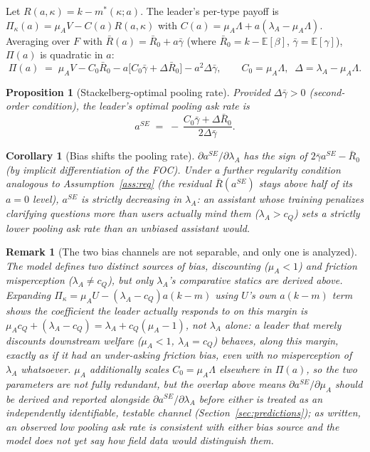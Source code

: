 \documentclass[11pt]{article}
\newtheorem{proposition}{Proposition}
\newtheorem{corollary}{Corollary}
\newtheorem{remark}{Remark}
\begin{document}
Let $R(a,\kappa)=k-m^*(\kappa;a)$. The leader's per-type payoff is
$\Pi_\kappa(a) = \mu_A V - C(a)R(a,\kappa)$ with $C(a)=\mu_A\Lambda + a(\lambda_A -
\mu_A\Lambda)$. Averaging over $F$ with $\bar R(a) = \bar R_0 + a\bar\gamma$
(where $\bar R_0=k-\mathbb{E}[\beta]$, $\bar\gamma=\mathbb{E}[\gamma]$), $\Pi(a)$
is quadratic in $a$:
\[
\Pi(a) \;=\; \mu_A V - C_0\bar R_0 - a\big[C_0\bar\gamma + \Delta\bar R_0\big] -
a^2\Delta\bar\gamma, \qquad C_0=\mu_A\Lambda,\;\; \Delta=\lambda_A-\mu_A\Lambda.
\]

\begin{proposition}[Stackelberg-optimal pooling rate]\label{prop:aSE}
Provided $\Delta\bar\gamma>0$ (second-order condition), the leader's optimal
pooling ask rate is
\[
a^{SE} \;=\; -\,\frac{C_0\bar\gamma + \Delta \bar R_0}{2\Delta\bar\gamma}.
\]
\end{proposition}

\begin{corollary}[Bias shifts the pooling rate]
$\partial a^{SE}/\partial \lambda_A$ has the sign of $2\bar\gamma a^{SE} - \bar
R_0$ (by implicit differentiation of the FOC). Under a further regularity
condition analogous to Assumption~\ref{ass:reg} (the residual $\bar R(a^{SE})$
stays above half of its $a{=}0$ level), $a^{SE}$ is strictly decreasing in
$\lambda_A$: an assistant whose training penalizes clarifying questions more than
users actually mind them ($\lambda_A>c_Q$) sets a strictly lower pooling ask rate
than an unbiased assistant would.
\end{corollary}

\begin{remark}[The two bias channels are not separable, and only one is analyzed]
\label{rmk:mu-lambda}
The model defines two distinct sources of bias, discounting ($\mu_A<1$) and
friction misperception ($\lambda_A\ne c_Q$), but only $\lambda_A$'s comparative
statics are derived above. Expanding $\Pi_\kappa=\mu_A U-(\lambda_A-c_Q)a(k-m)$
using $U$'s own $a(k-m)$ term shows the coefficient the leader actually responds
to on this margin is $\mu_A c_Q+(\lambda_A-c_Q)=\lambda_A+c_Q(\mu_A-1)$, not
$\lambda_A$ alone: a leader that merely discounts downstream welfare
($\mu_A<1$, $\lambda_A=c_Q$) behaves, along this margin, exactly as if it had an
under-asking friction bias, even with no misperception of $\lambda_A$ whatsoever.
$\mu_A$ additionally scales $C_0=\mu_A\Lambda$ elsewhere in $\Pi(a)$, so the two
parameters are not fully redundant, but the overlap above means $\partial
a^{SE}/\partial\mu_A$ should be derived and reported alongside
$\partial a^{SE}/\partial\lambda_A$ before either is treated as an independently
identifiable, testable channel (Section~\ref{sec:predictions}); as written, an
observed low pooling ask rate is consistent with either bias source and the
model does not yet say how field data would distinguish them.
\end{remark}
\end{document}
